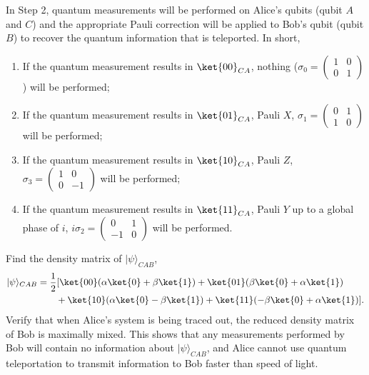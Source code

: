 \documentclass{beamer}
\begin{document}
\begin{frame}
\justify
In Step 2, quantum measurements will be performed on Alice's qubits (qubit $A$ and $C$) and the appropriate Pauli correction will be applied to Bob's qubit (qubit $B$) to recover the quantum information that is teleported. In short,
\begin{enumerate}
\item If the quantum measurement results in $\ket{00}_{CA}$, nothing ($\sigma_0 = \left( \begin{smallmatrix} 1 & 0 \\ 0 & 1 \end{smallmatrix} \right)$) will be performed;
\item If the quantum measurement results in $\ket{01}_{CA}$, Pauli $X$, $\sigma_1 = \left( \begin{smallmatrix} 0 & 1 \\ 1 & 0 \end{smallmatrix} \right)$ will be performed;
\item If the quantum measurement results in $\ket{10}_{CA}$, Pauli $Z$, $\sigma_3 = \left( \begin{smallmatrix} 1 & 0 \\ 0 & -1 \end{smallmatrix} \right)$ will be performed;
\item If the quantum measurement results in $\ket{11}_{CA}$, Pauli $Y$ up to a global phase of $i$, $i \sigma_2 = \left( \begin{smallmatrix} 0 & 1 \\ -1 & 0 \end{smallmatrix} \right)$ will be performed.
\end{enumerate}
\end{frame}

\begin{frame}
\justify
Find the density matrix of $|\psi\rangle_{CAB}$,
\begin{align}
|\psi\rangle_{CAB} & = \frac{1}{2} [ \ket{00} (\alpha \ket{0} + \beta \ket{1}) + \ket{01} (\beta \ket{0} + \alpha \ket{1}) \nonumber \\ & \qquad + \ket{10} (\alpha \ket{0} - \beta \ket{1}) + \ket{11} ( -\beta \ket{0} + \alpha \ket{1})].
\end{align}
Verify that when Alice's system is being traced out, the reduced density matrix of Bob is maximally mixed.
\vfill
This shows that any measurements performed by Bob will contain no information about $|\psi\rangle_{CAB}$, and Alice cannot use quantum teleportation to transmit information to Bob faster than speed of light.
\end{frame}
\end{document}
